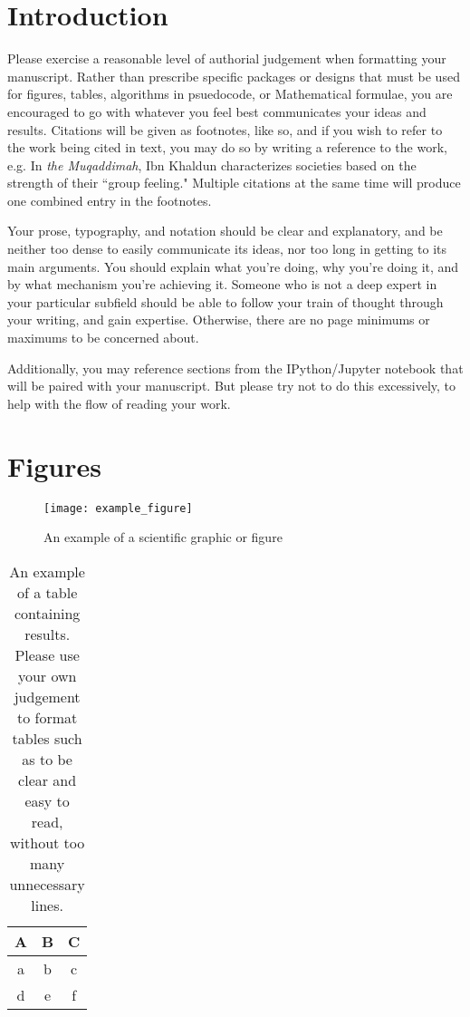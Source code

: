 \documentclass[twoside,12pt]{article}
\begin{document}
\section{Introduction}

Please exercise a reasonable level of authorial judgement when formatting your manuscript. Rather than prescribe specific packages or designs that must be used for figures, tables, algorithms in psuedocode, or Mathematical formulae, you are encouraged to go with whatever you feel best communicates your ideas and results. Citations will be given as footnotes, like so\cite{einstein1905electrodynamics}, and if you wish to refer to the work being cited in text, you may do so by writing a reference to the work, e.g. In \textit{the Muqaddimah}\cite{khaldun2015muqaddimah}, Ibn Khaldun characterizes societies based on the strength of their ``group feeling." Multiple citations at the same time will produce one combined entry in the footnotes.

Your prose, typography, and notation should be clear and explanatory, and be neither too dense to easily communicate its ideas, nor too long in getting to its main arguments. You should explain what you're doing, why you're doing it, and by what mechanism you're achieving it. Someone who is not a deep expert in your particular subfield should be able to follow your train of thought through your writing, and gain expertise. Otherwise, there are no page minimums or maximums to be concerned about.

Additionally, you may reference sections from the IPython/Jupyter notebook that will be paired with your manuscript. But please try not to do this excessively, to help with the flow of reading your work.

\section{Figures}

\begin{figure}
    \centering
    \texttt{[image: example\_figure]}
    \caption{An example of a scientific graphic or figure}
    \label{fig:my_label}
\end{figure}

\begin{table}
    \centering
    \begin{tabular}{c|cc}
        A & B & C \\
        \hline
        a & b & c \\ 
        d & e & f \\
    \end{tabular}
    \caption{An example of a table containing results. Please use your own judgement to format tables such as to be clear and easy to read, without too many unnecessary lines.}
    \label{tab:my_table}
\end{table}
\end{document}
